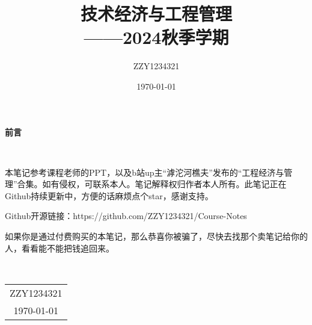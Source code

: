 \documentclass[12pt, a4paper, oneside]{ctexbook}
\title{{\Huge{\textbf{技术经济与工程管理}}}\\——2024秋季学期}
\author{ZZY1234321}
\date{\today}
\begin{document}
\pagestyle{fancy}
\fancyhf{}
\fancyhead[L]{\leftmark}
\fancyhead[R]{\thepage}
\renewcommand{\headheight}{15pt} %
\setlength{\headsep}{20pt} %

\maketitle

\setcounter{page}{1}

\begin{center}
    \Huge\textbf{前言}
\end{center}~\

本笔记参考课程老师的PPT，以及b站up主“滹沱河樵夫”发布的“工程经济与管理”合集。如有侵权，可联系本人。笔记解释权归作者本人所有。此笔记正在Github持续更新中，方便的话麻烦点个star，感谢支持。

Github开源链接：https://github.com/ZZY1234321/Course-Notes

如果你是通过付费购买的本笔记，那么恭喜你被骗了，尽快去找那个卖笔记给你的人，看看能不能把钱追回来。

~\\
\begin{flushright}
    \begin{tabular}{c}
        ZZY1234321\\
        \today
    \end{tabular}
\end{flushright}

\newpage
{}
\setcounter{page}{1}
\tableofcontents
\newpage
\setcounter{page}{1}










\end{document}

